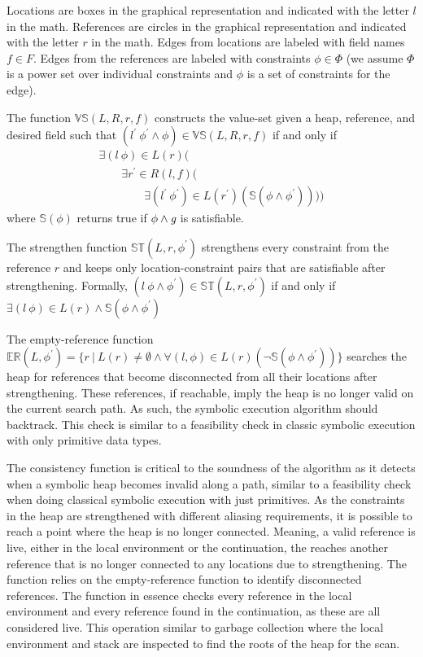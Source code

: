 Locations are boxes in the graphical representation and indicated with
the letter $l$ in the math. References are circles in the graphical
representation and indicated with the letter $r$ in the math. Edges
from locations are labeled with field names $f \in F$. Edges from the
references are labeled with constraints $\phi \in \Phi$ (we assume
$\Phi$ is a power set over individual constraints and $\phi$ is a set
of constraints for the edge).

The function $\mathbb{VS}(L,R,r,f)$ constructs the value-set given a
heap, reference, and desired field such that
$(l^\prime\ \phi^\prime\wedge\phi) \in \mathbb{VS}(L,R,r,f)$ if and
only if
\[
\begin{array}{l}
  \exists (l\ \phi) \in L(r) ( \\
  \ \ \ \ \ \ \ \ \ \exists r^\prime \in R(l,f) ( \\
  \ \ \ \ \ \ \ \ \ \ \ \ \ \ \ \ \ \ \exists (l^\prime\ \phi^\prime) \in L(r^\prime) (\mathbb{S}(\phi\wedge\phi^\prime))))
\end{array}
\]
where $\mathbb{S}(\phi)$ returns true if $\phi \wedge \emph{g} $ is satisfiable.

The strengthen function $\mathbb{ST}(L,r,\phi^\prime)$ strengthens every
constraint from the reference $r$ and keeps only location-constraint
pairs that are satisfiable after strengthening. Formally,
$(l\ \phi\wedge\phi^\prime)\in\mathbb{ST}(L,r,\phi^\prime)$ if and
only if $\exists (l\ \phi)\in
L(r)\wedge\mathbb{S}(\phi\wedge\phi^\prime)$

The empty-reference function $\mathbb{ER}(L,\phi^\prime) = \{r\ |\ L(r) \neq
\emptyset \wedge \forall(l,\phi) \in L(r)(\neg \mathbb{S}(\phi \wedge
\phi^\prime))\}$ searches the heap for references that become
disconnected from all their locations after strengthening. These
references, if reachable, imply the heap is no longer valid on the
current search path. As such, the symbolic execution algorithm should
backtrack. This check is similar to a feasibility check in classic
symbolic execution with only primitive data types.

The consistency function is critical to the soundness of the algorithm
as it detects when a symbolic heap becomes invalid along a path,
similar to a feasibility check when doing classical symbolic execution
with just primitives. As the constraints in the heap are strengthened
with different aliasing requirements, it is possible to reach a point
where the heap is no longer connected. Meaning, a valid reference is
live, either in the local environment or the continuation, the reaches
another reference that is no longer connected to any locations due to
strengthening. The function relies on the empty-reference function to
identify disconnected references. The function in essence checks every
reference in the local environment and every reference found in the
continuation, as these are all considered live. This operation similar
to garbage collection where the local environment and stack are
inspected to find the roots of the heap for the scan.


